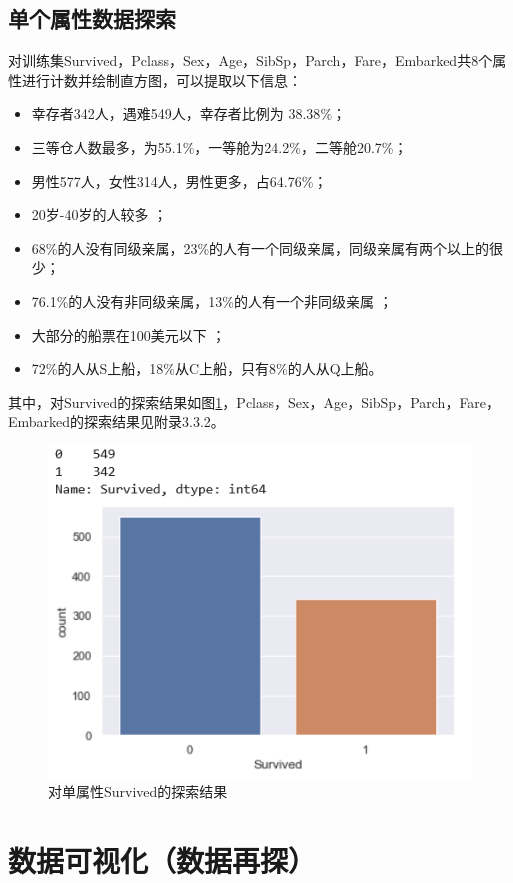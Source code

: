 \subsection{单个属性数据探索}
对训练集Survived，Pclass，Sex，Age，SibSp，Parch，Fare，Embarked共8个属性进行计数并绘制直方图，可以提取以下信息：
\begin{itemize}
	\item 幸存者342人，遇难549人，幸存者比例为 $38.38 \%$；
	\item 三等仓人数最多，为55.1\%，一等舱为24.2\%，二等舱20.7\%；
	\item 男性577人，女性314人，男性更多，占64.76\%；
	\item  20岁-40岁的人较多 ；
	\item 68\%的人没有同级亲属，23\%的人有一个同级亲属，同级亲属有两个以上的很少；
	\item 76.1\%的人没有非同级亲属，13\%的人有一个非同级亲属 ；
	\item 大部分的船票在100美元以下 ；
	\item 72\%的人从S上船，18\%从C上船，只有8\%的人从Q上船。
\end{itemize}
其中，对Survived的探索结果如图\ref{5}，Pclass，Sex，Age，SibSp，Parch，Fare，Embarked的探索结果见附录3.3.2。
\begin{figure}[H]
	\centering
	\includegraphics[scale=0.8,angle=0]{images/5.png}
	\caption{对单属性Survived的探索结果}
	\label{5}
\end{figure}

\clearpage

\section{数据可视化（数据再探）}
